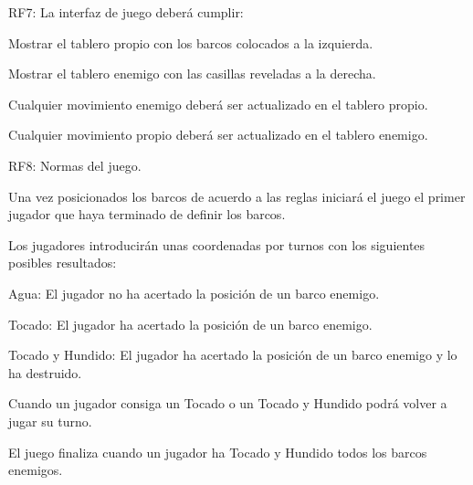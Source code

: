 \begin{DoxyItemize}
\item R\+F7\+: La interfaz de juego deberá cumplir\+:
\begin{DoxyItemize}
\item Mostrar el tablero propio con los barcos colocados a la izquierda.
\item Mostrar el tablero enemigo con las casillas reveladas a la derecha.
\item Cualquier movimiento enemigo deberá ser actualizado en el tablero propio.
\item Cualquier movimiento propio deberá ser actualizado en el tablero enemigo.
\end{DoxyItemize}
\item R\+F8\+: Normas del juego.
\begin{DoxyItemize}
\item Una vez posicionados los barcos de acuerdo a las reglas iniciará el juego el primer jugador que haya terminado de definir los barcos.
\item Los jugadores introducirán unas coordenadas por turnos con los siguientes posibles resultados\+:
\begin{DoxyItemize}
\item Agua\+: El jugador no ha acertado la posición de un barco enemigo.
\item Tocado\+: El jugador ha acertado la posición de un barco enemigo.
\item Tocado y Hundido\+: El jugador ha acertado la posición de un barco enemigo y lo ha destruido.
\end{DoxyItemize}
\item Cuando un jugador consiga un Tocado o un Tocado y Hundido podrá volver a jugar su turno.
\item El juego finaliza cuando un jugador ha Tocado y Hundido todos los barcos enemigos. 
\end{DoxyItemize}
\end{DoxyItemize}